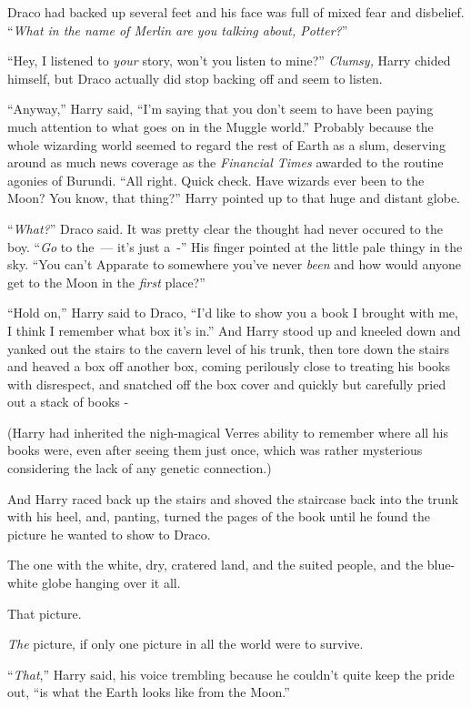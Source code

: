 Draco had backed up several feet and his face was full of mixed fear and disbelief. ``\emph{What in the name of Merlin are you talking about, Potter?}''

``Hey, I listened to \emph{your} story, won't you listen to mine?'' \emph{Clumsy,} Harry chided himself, but Draco actually did stop backing off and seem to listen.

``Anyway,'' Harry said, ``I'm saying that you don't seem to have been paying much attention to what goes on in the Muggle world.'' Probably because the whole wizarding world seemed to regard the rest of Earth as a slum, deserving around as much news coverage as the \emph{Financial Times} awarded to the routine agonies of Burundi. ``All right. Quick check. Have wizards ever been to the Moon? You know, that thing?'' Harry pointed up to that huge and distant globe.

``\emph{What?}'' Draco said. It was pretty clear the thought had never occured to the boy. ``\emph{Go} to the~--- it's just a~-'' His finger pointed at the little pale thingy in the sky. ``You can't Apparate to somewhere you've never \emph{been} and how would anyone get to the Moon in the \emph{first} place?''

``Hold on,'' Harry said to Draco, ``I'd like to show you a book I brought with me, I think I remember what box it's in.'' And Harry stood up and kneeled down and yanked out the stairs to the cavern level of his trunk, then tore down the stairs and heaved a box off another box, coming perilously close to treating his books with disrespect, and snatched off the box cover and quickly but carefully pried out a stack of books -

(Harry had inherited the nigh-magical Verres ability to remember where all his books were, even after seeing them just once, which was rather mysterious considering the lack of any genetic connection.)

And Harry raced back up the stairs and shoved the staircase back into the trunk with his heel, and, panting, turned the pages of the book until he found the picture he wanted to show to Draco.

The one with the white, dry, cratered land, and the suited people, and the blue-white globe hanging over it all.

That picture.

\emph{The} picture, if only one picture in all the world were to survive.

``\emph{That},'' Harry said, his voice trembling because he couldn't quite keep the pride out, ``is what the Earth looks like from the Moon.''

